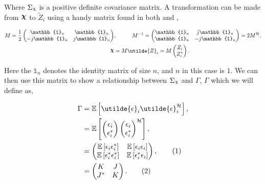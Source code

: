 \documentclass[honours,12pt]{unswthesis}
\newcommand{\E}{\mathbb{E}}
\newcommand{\ct}{\mathcal{H}}
\DeclareRobustCommand{\Chi}{{\mathpalette\irchi\relax}}
\newcommand{\irchi}[2]{\raisebox{\depth}{$#1\chi$}} %
\newcommand\numberthis{\addtocounter{equation}{1}\tag{\theequation}}
\numberwithin{equation}{section}
\begin{document}
\noindent Where $\Sigma_{\Chi}$ is a positive definite covariance matrix. A transformation can be made from $\bm{\Chi}$ to $\utilde{Z}_{i}$ using a handy matrix found in both \cite{ducharme2016} and \cite{picinobo1998},

\begin{align*}
	M = \frac{1}{2} \begin{pmatrix}
		\mathbb{1}_{n} & \mathbb{1}_{n} \\
		-j \mathbb{1}_{n} & j \mathbb{1}_{n}
	\end{pmatrix}&, \hspace{1cm}
	M^{-1} = \begin{pmatrix}
		\mathbb{1}_{n} & j \mathbb{1}_{n} \\
		\mathbb{1}_{n} & -j \mathbb{1}_{n}
	\end{pmatrix}  = 2 M^{\ct},\\
	\bm{\Chi} &= M \utilde{Z}_{i} = M \begin{pmatrix} Z_{i} \\ Z_{i}^{*} \end{pmatrix}.
\end{align*}

\noindent Here the $\mathbb{1}_{n}$ denotes the identity matrix of size $n$, and $n$ in this case is $1$. We can then use this matrix to show a relationship between $\Sigma_{\Chi}$ and $\Gamma$, $\Gamma$ which we will define as,

\begin{align*}
	\Gamma &= \E \left[ \utilde{\epsilon}_{i} \utilde{\epsilon}_{i}^{\ct}\right], \\
	&=\E \left[ 
		\begin{pmatrix}
			\epsilon_{i} \\
			\epsilon_{i}^{*}
		\end{pmatrix}
		\begin{pmatrix}
			\epsilon_{i} \\
			\epsilon_{i}^{*}
		\end{pmatrix}^{\ct}
	\right], \\
	&= \begin{pmatrix}
		\E \left[
			\epsilon_{i} \epsilon_{i}^{*}
		\right] &
		\E \left[
			\epsilon_{i} \epsilon_{i}
		\right] \\
		\E \left[
			\epsilon_{i}^{*} \epsilon_{i}^{*}
		\right] &
		\E \left[
			\epsilon_{i}^{*} \epsilon_{i}
		\right]
	\end{pmatrix}, \numberthis \label{complexcovarianceexpanded}\\
	&= \begin{pmatrix}
	K & J \\
	J^{*} &  K
	\end{pmatrix}. \numberthis \label{complexcovariancejk}
\end{align*}
\end{document}
